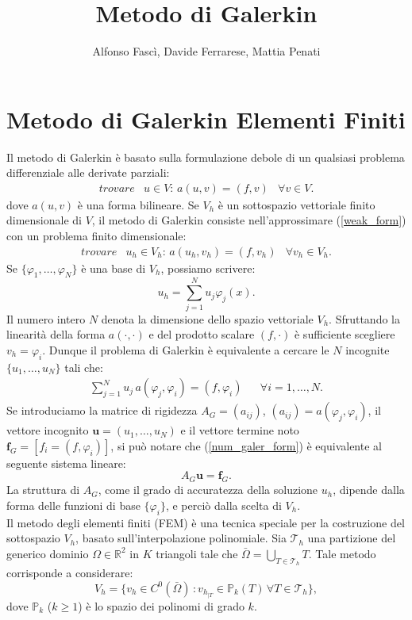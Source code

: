 \documentclass[10pt]{amsart}
\title[Metodo agli Elementi Finiti]{Metodo di Galerkin}
\author[A. Fasc\`i, D. Ferrarese, M. Penati]{Alfonso Fasc\`i, Davide Ferrarese, Mattia Penati}
\begin{document}
\maketitle
\section{Metodo di Galerkin Elementi Finiti}
Il metodo di Galerkin \`e basato sulla formulazione debole di un qualsiasi problema differenziale alle derivate parziali:
\begin{eqnarray}
\label{weak_form}
trovare & u \in V :\,a(u,v)=(f,v) & \forall v \in V.
\end{eqnarray}
dove $a(u,v)$ \`e una forma bilineare. Se $V_h$ \`e un sottospazio vettoriale finito dimensionale di $V$, il metodo di Galerkin consiste nell'approssimare (\ref{weak_form}) con un problema finito dimensionale:
\begin{eqnarray}
\label{galer_form}
trovare & u_h \in V_h :\,a(u_h,v_h)=(f,v_h) & \forall v_h \in V_h.
\end{eqnarray}
Se $\{ \varphi_1, \dots, \varphi_N\}$ \`e una base di $V_h$, possiamo scrivere:
\begin{equation}
u_h = \sum_{j=1}^N u_j \varphi_j (x).
\end{equation}
Il numero intero $N$ denota la dimensione dello spazio vettoriale $V_h$. Sfruttando la linearit\`a della forma $a(\cdot, \cdot)$ e del prodotto scalare $(f,\cdot)$ \`e sufficiente scegliere $v_h = \varphi_i$. Dunque il problema di Galerkin \`e equivalente a cercare le $N$ incognite $\{u_1, \dots, u_N\}$ tali che:
\begin{eqnarray}
\label{num_galer_form}
\sum_{j=1}^N u_j \, a(\varphi_j , \varphi_i) = (f, \varphi_i) & & \forall i = 1, \dots, N.
\end{eqnarray}
Se introduciamo la matrice di rigidezza $A_G = (a_{ij})$, $(a_{ij}) = a(\varphi_j , \varphi_i)$, il vettore incognito $\mathbf{u} = (u_1 , \dots, u_N)$ e il vettore termine noto $\mathbf{f}_G = [f_i =  (f, \varphi_i)]$, si pu\`o notare che (\ref{num_galer_form}) \`e equivalente al seguente sistema lineare:
\begin{equation}
\label{alg_galer_form}
A_G \mathbf{u} = \mathbf{f}_G.
\end{equation}
La struttura di $A_G$, come il grado di accuratezza della soluzione 
$u_h$, dipende dalla forma delle funzioni di base $\{ \varphi_i \}$, e 
perci\`o dalla scelta di $V_h$.\\
Il metodo degli elementi finiti (FEM) \`e una tecnica speciale per la costruzione del sottospazio $V_h$, basato sull'interpolazione polinomiale. Sia $\mathcal{T}_h$  una partizione del generico dominio ${\Omega} \in \mathbb{R}^2$ in $K$ triangoli tale che $\bar{\Omega} = \bigcup_{T \in \mathcal{T}_h} T$. Tale metodo corrisponde a considerare:
\begin{equation}
V_h = \{ v_h \in C^0 (\bar{\Omega}) \, : v_{h_{|T}} \in \mathbb{P}_k (T)\, \forall T \in \mathcal{T}_h \},
\end{equation}
dove $\mathbb{P}_k$ ($k \ge 1$) \`e lo spazio dei polinomi di grado $k$.
\end{document}
